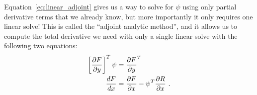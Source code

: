 \documentclass[conf]{new-aiaa}
\begin{document}
    Equation~\eqref{eq:linear_adjoint} gives us a way to solve for $\psi$ using only partial derivative terms that we already know, but more importantly it only requires one linear solve! 
    This is called the ``adjoint analytic method'', and it allows us to compute the total derivative we need with only a single linear solve with the following two equations:
    \begin{align}
        \left[{\frac{\partial F}{\partial y}} \right]^T \psi &=  \frac{\partial F}{\partial y}^{T} \notag \\
        \frac{d F}{d x} &= \frac{\partial F}{\partial x} - \psi^T\frac{\partial R}{\partial x} \ .
    \end{align}


\end{document}
